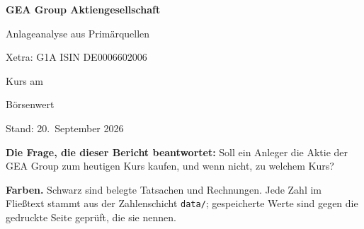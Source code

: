 \begin{titlepage}
\centering
\vspace*{3cm}
{\Huge\bfseries GEA Group Aktiengesellschaft\par}
\vspace{0.8cm}
{\Large Anlageanalyse aus Prim\"arquellen\par}
\vspace{0.4cm}
{\large Xetra: G1A \textbar{} ISIN DE0006602006\par}
\vspace{2.5cm}
{\large Kurs  am \KursDatum\par}
\vspace{0.3cm}
{\large B\"orsenwert \par}
\vspace{3cm}
{\large Stand: 20.~September 2026\par}
\vspace{1cm}
\begin{minipage}{0.86\linewidth}\small
\textbf{Die Frage, die dieser Bericht beantwortet:} Soll ein Anleger die Aktie der GEA
Group zum heutigen Kurs kaufen, und wenn nicht, zu welchem Kurs?

\medskip
\textbf{Farben.} Schwarz sind belegte Tatsachen und Rechnungen.   Jede Zahl im Flie{\ss}text stammt
aus der Zahlenschicht \texttt{data/}; \GeprueftAnzahl{} gespeicherte Werte sind gegen die
gedruckte Seite gepr\"uft, die sie nennen.
\end{minipage}
\end{titlepage}
